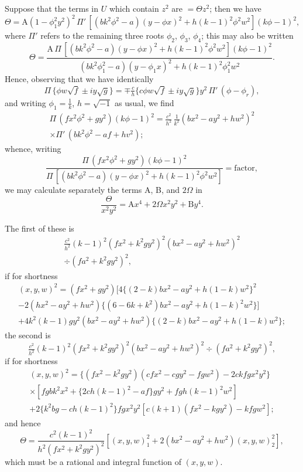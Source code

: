 \documentclass[12pt,a4paper]{article}
\theoremstyle{plain}
\begin{document}
Suppose that the terms in $U$ which contain $z^{2}$ are $= \Theta z^{2}$; then we have
\[
\Theta = \text{A}(1 - \phi_{1}^{2}y^{2})^{2}\,\Pi'\,[(bk^{2}\phi^{2} - a)(y - \phi x)^{2} + h(k-1)^{2}\phi^{2}w^{2}](k\phi - 1)^{2},
\]
where $\Pi'$ refers to the remaining three roots $\phi_{2}$, $\phi_{3}$, $\phi_{4}$; this may also be written
\[
\Theta = \frac{\text{A}\,\Pi\,[(bk^{2}\phi^{2} - a)(y - \phi x)^{2} + h(k-1)^{2}\phi^{2}w^{2}](k\phi - 1)^{2}}{(bk^{2}\phi_{1}^{2} - a)(y - \phi_{1}x)^{2} + h(k-1)^{2}\phi_{1}^{2}w^{2}}.
\]
Hence, observing that we have identically
\[
\Pi\,\{\phi w\sqrt{f} \pm iy\sqrt{g}\} = \mp\tfrac{c}{h}\{c\phi w\sqrt{f} \pm iy\sqrt{g}\}y^{2}\,\Pi'\,(\phi - \phi_{r}),
\]
and writing $\phi_{1} = \tfrac{1}{k}$, $h = \sqrt{-1}$ as usual, we find
%
\begin{multline}
\Pi\,(fx^{2}\phi^{2} + gy^{2})(k\phi - 1)^{2} = \tfrac{c^{2}}{h^{2}}\,\tfrac{1}{k^{2}}(bx^{2} - ay^{2} + hw^{2})^{2} \\
\times \Pi'\,(bk^{2}\phi^{2} - af + hv^{2});
\end{multline}
%
whence, writing
\[
\frac{\Pi\,(fx^{2}\phi^{2} + gy^{2})(k\phi - 1)^{2}}{\Pi\,[(bk^{2}\phi^{2} - a)(y - \phi x)^{2} + h(k-1)^{2}\phi^{2}w^{2}]} = \text{factor},
\]
we may calculate separately the terms A, B, and $2\Omega$ in
\[
\frac{\Theta}{x^{2}y^{2}} = \text{A}x^{4} + 2\Omega x^{2}y^{2} + \text{B}y^{4}.
\]

\newpage
\setcounter{page}{107}

The first of these is
%
\begin{multline}
\tfrac{c^{2}}{h^{2}}(k-1)^{2}(fx^{2} + k^{2}gy^{2})^{2}(bx^{2} - ay^{2} + hw^{2})^{2} \\
\div (fa^{2} + k^{2}gy^{2})^{2},
\end{multline}
%
if for shortness
%
\begin{multline}
(x, y, w)^{2} = (fx^{2} + gy^{2})[4\{(2-k)bx^{2} - ay^{2} + h(1-k)w^{2}\}^{2} \\
- 2(hx^{2} - ay^{2} + hw^{2})\{(6 - 6k + k^{2})bx^{2} - ay^{2} + h(1-k)^{2}w^{2}\}] \\
+ 4k^{2}(k-1)gy^{2}(bx^{2} - ay^{2} + hw^{2})\{(2-k)bx^{2} - ay^{2} + h(1-k)w^{2}\};
\end{multline}
%
the second is
\[
\tfrac{c^{2}}{h^{2}}(k-1)^{2}(fx^{2} + k^{2}gy^{2})^{2}(bx^{2} - ay^{2} + hw^{2})^{2} \div (fa^{2} + k^{2}gy^{2})^{2},
\]
if for shortness
%
\begin{multline}
(x, y, w)^{2} = \{(fx^{2} - k^{2}gy^{2})(cfx^{2} - cgy^{2} - fgw^{2}) - 2ckfgx^{2}y^{2}\} \\
\times [fgbk^{2}x^{2} + \{2ch(k-1)^{2} - af\}gy^{2} + fgh(k-1)^{2}w^{2}] \\
+ 2\{k^{2}bg - ch(k-1)^{2}\}fgx^{2}y^{2}[c(k+1)(fx^{2} - kgy^{2}) - kfgw^{2}];
\end{multline}
%
and hence
\[
\Theta = \frac{c^{2}(k-1)^{2}}{h^{2}(fx^{2} + k^{2}gy^{2})^{2}}[(x, y, w)_{1}^{2} + 2(bx^{2} - ay^{2} + hw^{2})(x, y, w)_{2}^{2}],
\]
which must be a rational and integral function of $(x, y, w)$.
\end{document}
